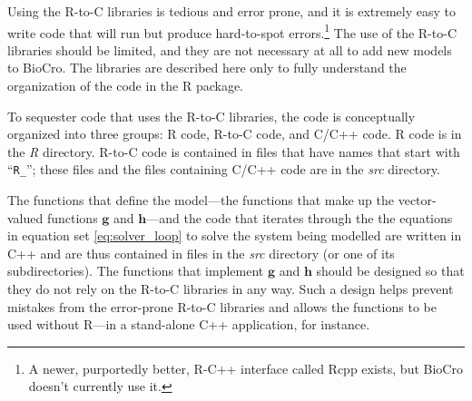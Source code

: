 \documentclass{article}
\newcommand{\code}[1]{\texttt{#1}}
\newcommand{\g}{\mathbf{g}}
\newcommand{\h}{\mathbf{h}}
\begin{document}
Using the R-to-C libraries is tedious and error prone, and it is
extremely easy to write code that will run but produce hard-to-spot
errors.\footnote{A newer, purportedly better, R-C++ interface called
  Rcpp exists, but BioCro doesn't currently use it.} The use of the
R-to-C libraries should be limited, and they are not necessary at all
to add new models to BioCro. The libraries are described here only to
fully understand the organization of the code in the R package.

To sequester code that uses the R-to-C libraries, the code is
conceptually organized into three groups: R code, R-to-C code, and
C/C++ code. R code is in the \emph{R} directory. R-to-C code is
contained in files that have names that start with ``\code{R\_}'';
these files and the files containing C/C++ code are in the \emph{src}
directory.

The functions that define the model---the functions that make up the
vector-valued functions $\g$ and $\h$---and the code that iterates
through the the equations in equation set \ref{eq:solver_loop} to
solve the system being modelled are written in C++ and are thus
contained in files in the \emph{src} directory (or one of its
subdirectories). The functions that implement $\g$ and $\h$ should be
designed so that they do not rely on the R-to-C libraries in any
way. Such a design helps prevent mistakes from the error-prone R-to-C
libraries and allows the functions to be used without R---in a
stand-alone C++ application, for instance.
\end{document}
